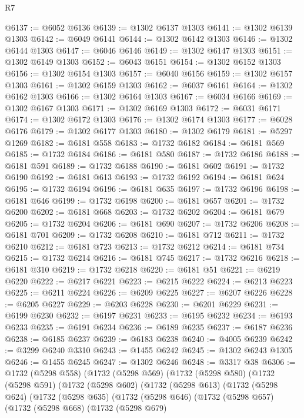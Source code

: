 \begin{lexlean}{R7}
\begin{coremodule}
@6137 := @6052 @6136
@6139 := @1302 @6137 @1303
@6141 := @1302 @6139 @1303
@6142 := @6049 @6141
@6144 := @1302 @6142 @1303
@6146 := @1302 @6144 @1303
@6147 := @6046 @6146
@6149 := @1302 @6147 @1303
@6151 := @1302 @6149 @1303
@6152 := @6043 @6151
@6154 := @1302 @6152 @1303
@6156 := @1302 @6154 @1303
@6157 := @6040 @6156
@6159 := @1302 @6157 @1303
@6161 := @1302 @6159 @1303
@6162 := @6037 @6161
@6164 := @1302 @6162 @1303
@6166 := @1302 @6164 @1303
@6167 := @6034 @6166
@6169 := @1302 @6167 @1303
@6171 := @1302 @6169 @1303
@6172 := @6031 @6171
@6174 := @1302 @6172 @1303
@6176 := @1302 @6174 @1303
@6177 := @6028 @6176
@6179 := @1302 @6177 @1303
@6180 := @1302 @6179
@6181 := @5297 @1269
@6182 := @6181 @558
@6183 := @1732 @6182
@6184 := @6181 @569
@6185 := @1732 @6184
@6186 := @6181 @580
@6187 := @1732 @6186
@6188 := @6181 @591
@6189 := @1732 @6188
@6190 := @6181 @602
@6191 := @1732 @6190
@6192 := @6181 @613
@6193 := @1732 @6192
@6194 := @6181 @624
@6195 := @1732 @6194
@6196 := @6181 @635
@6197 := @1732 @6196
@6198 := @6181 @646
@6199 := @1732 @6198
@6200 := @6181 @657
@6201 := @1732 @6200
@6202 := @6181 @668
@6203 := @1732 @6202
@6204 := @6181 @679
@6205 := @1732 @6204
@6206 := @6181 @690
@6207 := @1732 @6206
@6208 := @6181 @701
@6209 := @1732 @6208
@6210 := @6181 @712
@6211 := @1732 @6210
@6212 := @6181 @723
@6213 := @1732 @6212
@6214 := @6181 @734
@6215 := @1732 @6214
@6216 := @6181 @745
@6217 := @1732 @6216
@6218 := @6181 @310
@6219 := @1732 @6218
@6220 := @6181 @51
@6221 := @6219 @6220
@6222 := @6217 @6221
@6223 := @6215 @6222
@6224 := @6213 @6223
@6225 := @6211 @6224
@6226 := @6209 @6225
@6227 := @6207 @6226
@6228 := @6205 @6227
@6229 := @6203 @6228
@6230 := @6201 @6229
@6231 := @6199 @6230
@6232 := @6197 @6231
@6233 := @6195 @6232
@6234 := @6193 @6233
@6235 := @6191 @6234
@6236 := @6189 @6235
@6237 := @6187 @6236
@6238 := @6185 @6237
@6239 := @6183 @6238
@6240 := @4005 @6239
@6242 := @3299 @6240 @3310
@6243 := @1455 @6242
@6245 := @1302 @6243 @1305
@6246 := @1455 @6245
@6247 := @1302 @6246
@6248 := @3317 @38
@6306 := @1732
    (@5298 @558)
    (@1732
      (@5298 @569)
      (@1732
        (@5298 @580)
        (@1732
          (@5298 @591)
          (@1732
            (@5298 @602)
            (@1732
              (@5298 @613)
              (@1732
                (@5298 @624)
                (@1732
                  (@5298 @635)
                  (@1732
                    (@5298 @646)
                    (@1732
                      (@5298 @657)
                      (@1732
                        (@5298 @668)
                        (@1732
                          (@5298 @679)

\end{coremodule}
\end{lexlean}
